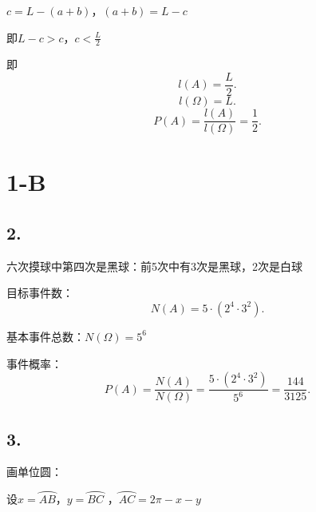 $c=L-\left( a+b \right)$，$\left( a+b \right) =L-c$

即$L-c>c$，$c<\frac{L}{2}$

即\[
    l\left( A \right) =\frac{L}{2}
.\]
\[
    l\left( \Omega \right) =L
.\] 
\[
    P\left( A \right) =\frac{l\left( A \right) }{l\left( \Omega \right) }=\frac{1}{2}
.\] 
\section{1-B}%
\label{sec:1-B}
\subsection{2.}%
\label{sub:2.}
六次摸球中第四次是黑球：前5次中有3次是黑球，2次是白球

目标事件数：\[
    N\left( A \right) =5\cdot \left( 2^4\cdot 3^2 \right) 
.\]

基本事件总数：$N\left( \Omega \right) =5^6$

事件概率：\[
    P\left( A \right) =\frac{N\left( A \right) }{N\left( \Omega \right) }=\frac{5\cdot \left( 2^4\cdot 3^2 \right) }{5^6} = \frac{144}{3125}
.\] 
\subsection{3.}%
\label{sub:3.}
画单位圆：
\begin{center}
\end{center}
设$x=\wideparen{AB}$，$y=\wideparen{BC}$ ，$\wideparen{AC}=2\pi-x-y$

